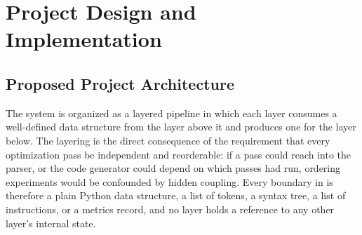 \chapter{Project Design and Implementation}

\section{Proposed Project Architecture}

The system is organized as a layered pipeline in which each layer consumes a well-defined data structure from the layer above it and produces one for the layer below. The layering is the direct consequence of the requirement that every optimization pass be independent and reorderable: if a pass could reach into the parser, or the code generator could depend on which passes had run, ordering experiments would be confounded by hidden coupling. Every boundary in  is therefore a plain Python data structure, a list of tokens, a syntax tree, a list of instructions, or a metrics record, and no layer holds a reference to any other layer's internal state.

